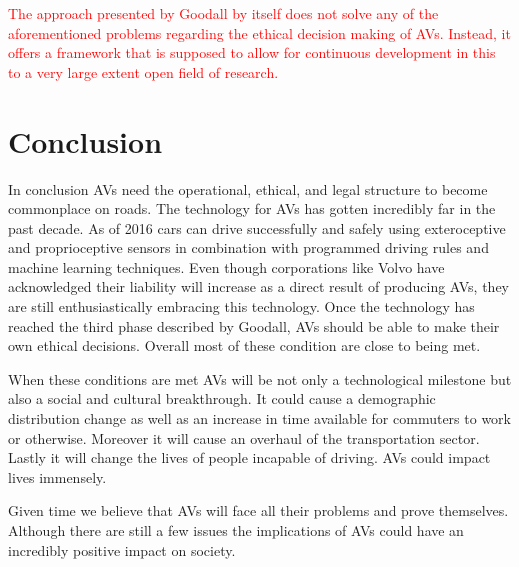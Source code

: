 \documentclass[11pt]{article}
\newcommand{\changed}[1]{\textcolor{red}{#1}}
\begin{document}
\changed{The approach presented by Goodall by itself does not solve any of the aforementioned problems regarding the ethical decision making of AVs. Instead, it offers a framework that is supposed to allow for continuous development in this to a very large extent open field of research. }

\section{Conclusion}
In conclusion AVs need the operational, ethical, and legal structure to become commonplace on roads. The technology for AVs has gotten incredibly far in the past decade. As of 2016 cars can drive successfully and safely using exteroceptive and proprioceptive sensors in combination with programmed driving rules and machine learning techniques. Even though corporations like Volvo have acknowledged their liability will increase as a direct result of producing AVs, they are still enthusiastically embracing this technology.  Once the technology has reached the third phase described by Goodall, AVs should be able to make their own ethical decisions. Overall most of these condition are close to being met. 


When these conditions are met AVs will be not only a technological milestone but also a social and cultural breakthrough. It could cause a demographic distribution change as well as an increase in time available for commuters to work or otherwise. Moreover it will cause an overhaul of the transportation sector. Lastly it will change the lives of people incapable of driving. AVs could impact lives immensely. 


Given time we believe that AVs will face all their problems and prove themselves. Although there are still a few issues the implications of AVs could have an incredibly positive impact on society. 



%

\end{document}
